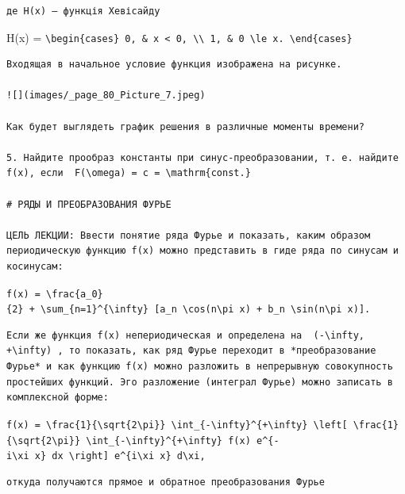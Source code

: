 \documentclass[
  ukrainian,
]{article}
\begin{document}
\begin{verbatim}
де H(x) — функція Хевісайду
\end{verbatim}

H(x) =
\texttt{\textbackslash{}begin\{cases\}\ 0,\ \&\ x\ \textless{}\ 0,\ \textbackslash{}\textbackslash{}\ 1,\ \&\ 0\ \textbackslash{}le\ x.\ \textbackslash{}end\{cases\}}

\begin{verbatim}
Входящая в начальное условие функция изображена на рисунке.

![](images/_page_80_Picture_7.jpeg)

Как будет выглядеть график решения в различные моменты времени?

5. Найдите прообраз константы при синус-преобразовании, т. е. найдите f(x), если  F(\omega) = c = \mathrm{const.} 

# РЯДЫ И ПРЕОБРАЗОВАНИЯ ФУРЬЕ

ЦЕЛЬ ЛЕКЦИИ: Ввести понятие ряда Фурье и показать, каким образом периодическую функцию f(x) можно представить в гиде ряда по синусам и косинусам:
\end{verbatim}

\texttt{f(x)\ =\ \textbackslash{}frac\{a\_0\}\{2\}\ +\ \textbackslash{}sum\_\{n=1\}\^{}\{\textbackslash{}infty\}\ {[}a\_n\ \textbackslash{}cos(n\textbackslash{}pi\ x)\ +\ b\_n\ \textbackslash{}sin(n\textbackslash{}pi\ x){]}.}

\begin{verbatim}
Если же функция f(x) непериодическая и определена на  (-\infty, +\infty) , то показать, как ряд Фурье переходит в *преобразование Фурье* и как функцию f(x) можно разложить в непрерывную совокупность простейших функций. Эго разложение (интеграл Фурье) можно записать в комплексной форме:
\end{verbatim}

\texttt{f(x)\ =\ \textbackslash{}frac\{1\}\{\textbackslash{}sqrt\{2\textbackslash{}pi\}\}\ \textbackslash{}int\_\{-\textbackslash{}infty\}\^{}\{+\textbackslash{}infty\}\ \textbackslash{}left{[}\ \textbackslash{}frac\{1\}\{\textbackslash{}sqrt\{2\textbackslash{}pi\}\}\ \textbackslash{}int\_\{-\textbackslash{}infty\}\^{}\{+\textbackslash{}infty\}\ f(x)\ e\^{}\{-i\textbackslash{}xi\ x\}\ dx\ \textbackslash{}right{]}\ e\^{}\{i\textbackslash{}xi\ x\}\ d\textbackslash{}xi,}

\begin{verbatim}
откуда получаются прямое и обратное преобразования Фурье
\end{verbatim}
\end{document}
